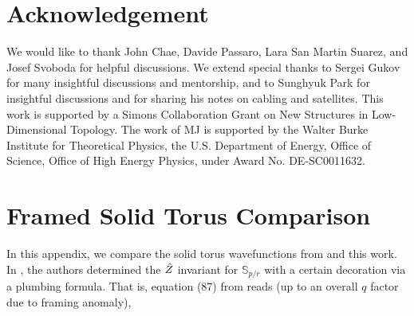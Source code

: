 \documentclass{article}
\numberwithin{corollary}{theorem}
\numberwithin{corollary}{proposition}
\begin{document}
    

\section*{Acknowledgement}
We would like to thank John Chae, Davide Passaro, Lara San Martin Suarez, and Josef Svoboda for helpful discussions. We extend special thanks to Sergei Gukov for many insightful discussions and mentorship, and to Sunghyuk Park for insightful discussions and for sharing his notes on cabling and satellites. This work is supported by a Simons Collaboration Grant on New Structures in Low-Dimensional Topology. The work of MJ is supported by the Walter Burke Institute for Theoretical Physics, the U.S. Department of Energy, Office of Science, Office of High Energy Physics, under Award No. DE-SC0011632.






\appendix




\section{Framed Solid Torus Comparison} 

In this appendix, we compare the solid torus wavefunctions from \cite{GM} and this work. In \cite{GM}, the authors determined the $\Hat{Z}$ invariant for $\mathbb{S}_{p/r}$ with a certain decoration via a plumbing formula. That is, equation (87) from \cite{GM} reads (up to an overall $q$ factor due to framing anomaly),
\end{document}
